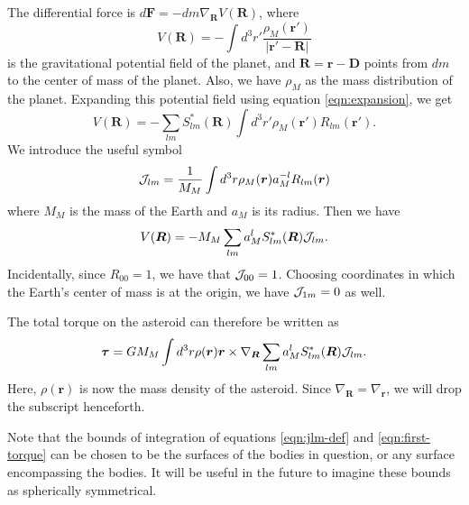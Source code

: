 \documentclass[aps,twocolumn,secnumarabic,balancelastpage,amsmath,amssymb,nofootinbib,floatfix]{revtex4-1}
\begin{document}
The differential force is $d\bm F = -dm \nabla_{\bm R} V(\bm R)$, where
$$V(\bm R) = -\int d^3 r' \frac{\rho_M(\bm r')}{|\bm r' - \bm R|}$$
is the gravitational potential field of the planet, and $\bm R = \bm r - \bm D$ points from $dm$ to the center of mass of the planet. Also, we have $\rho_M$ as the mass distribution of the planet. Expanding this potential field using equation \ref{eqn:expansion}, we get
$$V(\bm R) = -\sum_{lm}S^*_{lm}(\bm R)\int d^3 r' \rho_M(\bm r') R_{lm}(\bm r').$$
We introduce the useful symbol
\begin{equation}
\mathcal{J}_{lm} = \frac{1}{M_M}\int d^3 r \rho_M(\bm r) a_M^{-l} R_{lm} (\bm r)
\label{eqn:jlm-def}
\end{equation}
where $M_M$ is the mass of the Earth and $a_M$ is its radius. Then we have
\begin{equation}
V(\bm R) = -M_M\sum_{lm} a_M^{l} S^*_{lm} (\bm R) \mathcal{J}_{lm}.
\label{eqn:potential}
\end{equation}
Incidentally, since $R_{00} = 1$, we have that $\mathcal{J}_{00}=1$. Choosing coordinates in which the Earth's center of mass is at the origin, we have $\mathcal{J}_{1m}=0$ as well.

The total torque on the asteroid can therefore be written as
\begin{equation}
\bm \tau = GM_M \int d^3 r \rho(\bm r) \bm r \times \nabla_{\bm R} \sum_{lm} a_M^l S^*_{lm}(\bm R) \mathcal{J}_{lm}.
\label{eqn:first-torque}
\end{equation}
Here, $\rho(\bm r)$ is now the mass density of the asteroid. Since $\nabla_{\bm R} = \nabla_{\bm r}$, we will drop the subscript henceforth.

Note that the bounds of integration of equations \ref{eqn:jlm-def} and \ref{eqn:first-torque} can be chosen to be the surfaces of the bodies in question, or any surface encompassing the bodies. It will be useful in the future to imagine these bounds as spherically symmetrical.
\end{document}
